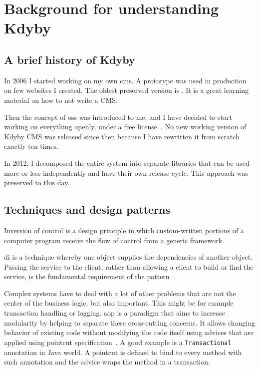 \chapter{Background for understanding Kdyby}

\section{A brief history of Kdyby} \label{sec:theory:kdyby-history}

In 2006 I started working on my own \gls{cms}. A prototype was used in production on few websites I created. The oldest preserved version is . It is a great learning material on how to not write a CMS.

Then the concept of \gls{oss} was introduced to me, and I have decided to start working on everything openly, under a free license~\cite{fsf:free-software}. No new working version of Kdyby CMS was released since then because I have rewritten it from scratch exactly ten times.

In 2012, I decomposed the entire system into separate libraries that can be used more or less independently and have their own release cycle. This approach was preserved to this day.

\section{Techniques and design patterns}

 \label{sec:theory:di}

Inversion of control is a design principle in which custom-written portions of a computer program receive the flow of control from a generic framework.

\Gls{di} is a technique whereby one object supplies the dependencies of another object. Passing the service to the client, rather than allowing a client to build or find the service, is the fundamental requirement of the pattern~\cite{fowler:di}.

 \label{sec:theory:aop}

Complex systems have to deal with a lot of other problems that are not the center of the business logic, but also important. This might be for example transaction handling or logging. \gls{aop} is a paradigm that aims to increase modularity by helping to separate these cross-cutting concerns. It allows changing behavior of existing code without modifying the code itself using advices that are applied using pointcut specification~\cite{kiczales1997aspect}. A good example is a \lstinline{Transactional} annotation in Java world. A pointcut is defined to bind to every method with such annotation and the advice wraps the method in a transaction.

